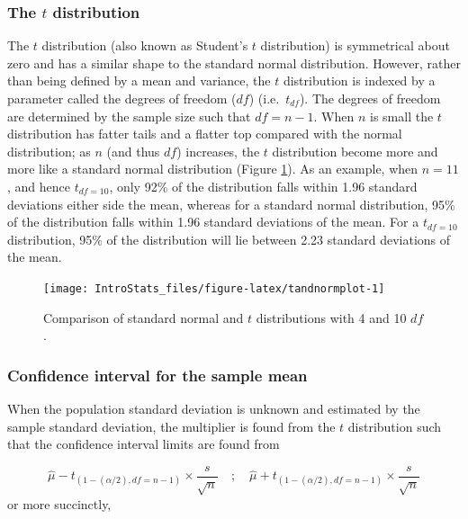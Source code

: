 \documentclass[
  oneside]{krantz}
\begin{document}
\hypertarget{the-t-distribution}{%
\subsubsection{\texorpdfstring{The \(t\) distribution}{The t distribution}}\label{the-t-distribution}}

The \(t\) distribution (also known as Student's \(t\) distribution) is symmetrical about zero and has a similar shape to the standard normal distribution. However, rather than being defined by a mean and variance, the \(t\) distribution is indexed by a parameter called the degrees of freedom (\(df\)) (i.e.~\(t_{df}\)). The degrees of freedom are determined by the sample size such that \(df=n-1\). When \(n\) is small the \(t\) distribution has fatter tails and a flatter top compared with the normal distribution; as \(n\) (and thus \(df\)) increases, the \(t\) distribution become more and more like a standard normal distribution (Figure \ref{fig:tandnormplot}). As an example, when \(n=11\), and hence \(t_{df=10}\), only 92\% of the distribution falls within 1.96 standard deviations either side the mean, whereas for a standard normal distribution, 95\% of the distribution falls within 1.96 standard deviations of the mean. For a \(t_{df=10}\) distribution, 95\% of the distribution will lie between 2.23 standard deviations of the mean.

\begin{figure}[!htb]

{\centering \texttt{[image: IntroStats\_files/figure-latex/tandnormplot-1]} 

}

\caption{Comparison of standard normal and $t$ distributions with 4 and 10 $df$.}\label{fig:tandnormplot}
\end{figure}

\hypertarget{confidence-interval-for-the-sample-mean}{%
\subsubsection{Confidence interval for the sample mean}\label{confidence-interval-for-the-sample-mean}}

When the population standard deviation is unknown and estimated by the sample standard deviation, the multiplier is found from the \(t\) distribution such that the confidence interval limits are found from

\[\hat{\mu} - t_{(1-(\alpha/2), df=n-1)} \times \frac{s}{\sqrt{n}} \quad;\quad \hat{\mu} + t_{(1-(\alpha/2), df=n-1)} \times \frac{s}{\sqrt{n}}\]
or more succinctly,
\end{document}
